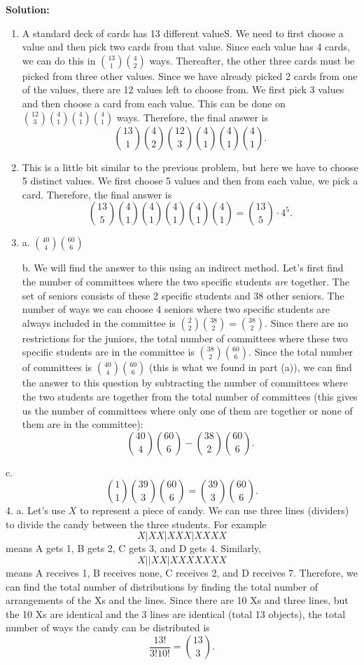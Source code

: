 \documentclass[
  12pt,
]{krantzNoCorner}
\begin{document}
\textbf{Solution:}

\begin{enumerate}
\def\labelenumi{\arabic{enumi}.}
\item
  A standard deck of cards has 13 different valueS. We need to first
  choose a value and then pick two cards from that value. Since each
  value has 4 cards, we can do this in \(\binom{13}{1}\binom{4}{2}\)
  ways. Thereafter, the other three cards must be picked from three
  other values. Since we have already picked 2 cards from one of the
  values, there are 12 values left to choose from. We first pick 3
  values and then choose a card from each value. This can be done on
  \(\binom{12}{3}\binom{4}{1}\binom{4}{1}\binom{4}{1}\) ways. Therefore,
  the final answer is
  \[\binom{13}{1}\binom{4}{2}\binom{12}{3}\binom{4}{1}\binom{4}{1}    \binom{4}{1}.\]
\item
  This is a little bit similar to the previous problem, but here we
  have to choose 5 distinct values. We first choose 5 values and then
  from each value, we pick a card. Therefore, the final answer is
  \[\binom{13}{5}\binom{4}{1}\binom{4}{1}\binom{4}{1}\binom{4}{1}\binom{4}     {1}=\binom{13}{5}\cdot 4^5.\]
\item
  a. \(\binom{40}{4}\binom{60}{6}\)

  b. We will find the answer to this using an indirect method. Let's
  first find the number of committees where the two specific students
  \textit{are} together. The set of seniors consists of these 2
  specific students and 38 other seniors. The number of ways we can
  choose 4 seniors where two specific students are always included in
  the committee is \(\binom{2}{2}\binom{38}{2}=\binom{38}{2}.\) Since
  there are no restrictions for the juniors, the total number of
  committees where these two specific students are in the committee is
  \(\binom{38}{2}\binom{60}{6}.\) Since the total number of committees
  is \(\binom{40}{4}\binom{60}{6}\) (this is what we found in part (a)),
  we can find the answer to this question by subtracting the number of
  committees where the two students are together from the total number
  of committees (this gives us the number of committees where only one
  of them are together or none of them are in the committee):
  \[\binom{40}{4}\binom{60}{6}-\binom{38}{2}\binom{60}{6}.\]
\end{enumerate}

c.
\[\binom{1}{1}\binom{39}{3}\binom{60}{6}=\binom{39}{3}\binom{60}{6}.\]
4. a. Let's use \(X\) to represent a piece of candy. We can use three
lines (dividers) to divide the candy between the three students. For
example \[X|XX|XXX|XXXX\] means A gets 1, B gets 2, C gets 3, and D gets
4. Similarly, \[X||XX|XXXXXXX\] means A receives 1, B receives none, C
receives 2, and D receives 7. Therefore, we can find the total number of
distributions by finding the total number of arrangements of the Xs and
the lines. Since there are 10 Xs and three lines, but the 10 Xs are
identical and the 3 lines are identical (total 13 objects), the total
number of ways the candy can be distributed is
\[\frac{13!}{3!10!}=\binom{13}{3}.\]
\end{document}

